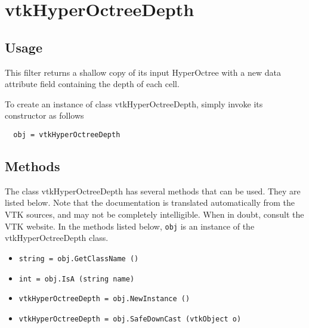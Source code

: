 \section{vtkHyperOctreeDepth}

\subsection{Usage}

 This filter returns a shallow copy of its input HyperOctree with a new
 data attribute field containing the depth of each cell.

To create an instance of class vtkHyperOctreeDepth, simply
invoke its constructor as follows
\begin{verbatim}
  obj = vtkHyperOctreeDepth
\end{verbatim}
\subsection{Methods}

The class vtkHyperOctreeDepth has several methods that can be used.
  They are listed below.
Note that the documentation is translated automatically from the VTK sources,
and may not be completely intelligible.  When in doubt, consult the VTK website.
In the methods listed below, \verb|obj| is an instance of the vtkHyperOctreeDepth class.
\begin{itemize}
\item  \verb|string = obj.GetClassName ()|

\item  \verb|int = obj.IsA (string name)|

\item  \verb|vtkHyperOctreeDepth = obj.NewInstance ()|

\item  \verb|vtkHyperOctreeDepth = obj.SafeDownCast (vtkObject o)|

\end{itemize}
